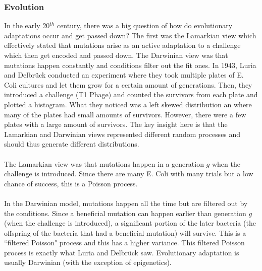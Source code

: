 \documentclass{article}
\begin{document}
\subsubsection{Evolution}
In the early 20$^{th}$ century, there was a big question of how do evolutionary adaptations occur and get passed down? The first was the Lamarkian view which effectively stated that mutations arise as an active adaptation to a challenge which then get encoded and passed down. The Darwinian view was that mutations happen constantly and conditions filter out the fit ones. In 1943, Luria and Delbr\"uck conducted an experiment where they took multiple plates of E. Coli cultures and let them grow for a certain amount of generations. Then, they introduced a challenge (T1 Phage) and counted the survivors from each plate and plotted a histogram. What they noticed was a left skewed distribution an where many of the plates had small amounts of survivors. However, there were a few plates with a large amount of survivors. The key insight here is that the Lamarkian and Darwinian views represented different random processes and should thus generate different distributions. \\\\
The Lamarkian view was that mutations happen in a generation $g$ when the challenge is introduced. Since there are many E. Coli with many trials but a low chance of success, this is a Poisson process. \\\\
In the Darwinian model, mutations happen all the time but are filtered out by the conditions. Since a beneficial mutation can happen earlier than generation $g$ (when the challenge is introduced), a significant portion of the later bacteria (the offspring of the bacteria that had a beneficial mutation) will survive. This is a ``filtered Poisson" process and this has a higher variance. This filtered Poisson process is exactly what Luria and Delbr\"uck  saw. Evolutionary adaptation is usually Darwinian (with the exception of epigenetics). 
\end{document}
